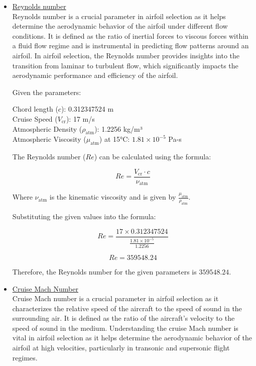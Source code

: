 \documentclass[12 pt]{article}
\begin{document}
\begin{itemize}
\item{\underline{Reynolds number}}
\color{black}
\\Reynolds number is a crucial parameter in airfoil selection as it helps determine the aerodynamic behavior of the airfoil under different flow conditions. It is defined as the ratio of inertial forces to viscous forces within a fluid flow regime and is instrumental in predicting flow patterns around an airfoil. In airfoil selection, the Reynolds number provides insights into the transition from laminar to turbulent flow, which significantly impacts the aerodynamic performance and efficiency of the airfoil.

Given the parameters:

 Chord length (\( c \)): 0.312347524 m\\
 Cruise Speed (\( V_{\text{cr}} \)): 17 m/s\\
 Atmospheric Density (\( \rho_{\text{atm}} \)): 1.2256 kg/m³\\
 Atmospheric Viscosity (\( \mu_{\text{atm}} \)) at 15°C: \( 1.81 \times 10^{-5} \) Pa-s

The Reynolds number (\( Re \)) can be calculated using the formula:

\[
Re = \frac{V_{\text{cr}} \cdot c}{\nu_{\text{atm}}} \tag{6.2}
\]

Where \( \nu_{\text{atm}} \) is the kinematic viscosity and is given by \( \frac{\mu_{\text{atm}}}{\rho_{\text{atm}}} \).

Substituting the given values into the formula:

\[
Re = \frac{17 \times 0.312347524}{\frac{1.81 \times 10^{-5}}{1.2256}} \tag{6.3}
\]

\[
Re = 359548.24
\]

Therefore, the Reynolds number for the given parameters is \( 359548.24 \). 

\item{\underline{Cruise Mach Number}}
\color{black}
\\Cruise Mach number is a crucial parameter in airfoil selection as it characterizes the relative speed of the aircraft to the speed of sound in the surrounding air. It is defined as the ratio of the aircraft's velocity to the speed of sound in the medium. Understanding the cruise Mach number is vital in airfoil selection as it helps determine the aerodynamic behavior of the airfoil at high velocities, particularly in transonic and supersonic flight regimes.


\end{itemize}
\end{document}
